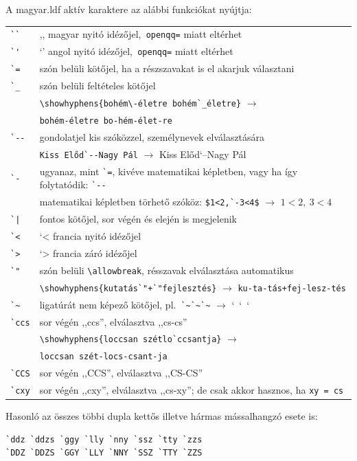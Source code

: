 \documentclass[12pt]{article}
\begin{document}
A \textsf{magyar.ldf} aktív karaktere az alábbi funkciókat nyújtja:
\begin{longtable}[l]{l|l}
\verb|``|   & ,, magyar nyitó idézőjel,\texttt{ openqq=} miatt eltérhet\\
\verb|`'|   & `' angol nyitó idézőjel,\texttt{ openqq=} miatt eltérhet\\
\verb|`=|   & szón belüli kötőjel, ha a részszavakat is el akarjuk választani\\
\verb|`_|   & szón belüli feltételes kötőjel\\
            & \verb|\showhyphens{bohém\-életre bohém`_életre}| $\to$\\
            & \texttt{bohém-életre bo-hém-élet-re}\\
\verb|`--|  & gondolatjel kis szóközzel, személynevek elválasztására\\
            & \verb|Kiss Előd`--Nagy Pál| $\to$ Kiss Előd`--Nagy Pál\\
\verb|`-|   & ugyanaz, mint \verb|`=|, kivéve matematikai képletben, vagy ha így folytatódik: \verb|`--|\\
            & matematikai képletben törhető szóköz: \verb|$1<2,`-3<4$| $\to$ $1<2,\ 3<4$\\
\verb!`|!   & fontos kötőjel, sor végén és elején is megjelenik\\
\verb|`<|   & `< francia nyitó idézőjel\\
\verb|`>|   & `> francia záró idézőjel\\
\verb|`"|   & szón belüli \verb|\allowbreak|, résszavak elválasztása automatikus\\
            & \verb|\showhyphens{kutatás`"+`"fejlesztés}| $\to$ \texttt{ku-ta-tás+fej-lesz-tés}\\
\verb|`~|   & ligatúrát nem képező kötőjel, pl.~\verb|`~`~`~| $\to$ `~`~`~\\
\verb|`ccs| & sor végén ,,ccs'', elválasztva ,,cs-cs''\\
            & \verb|\showhyphens{loccsan szétlo`ccsantja}| $\to$\\
            & \texttt{loccsan szét-locs-csant-ja}\\
\verb|`CCS| & sor végén ,,CCS'', elválasztva ,,CS-CS''\\
\verb|`cxy| & sor végén ,,cxy'', elválasztva ,,cs-xy''; de csak akkor hasznos, ha \texttt{xy = cs}
\end{longtable}
\noindent
Hasonló az összes többi dupla kettős illetve hármas mássalhangzó esete is:
\begin{verbatim}
`ddz `ddzs `ggy `lly `nny `ssz `tty `zzs
`DDZ `DDZS `GGY `LLY `NNY `SSZ `TTY `ZZS
\end{verbatim}
\end{document}
